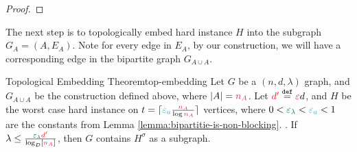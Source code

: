 \documentclass[11pt]{article}
\newcommand{\EnDeeLambda}{(n, d, \lambda)}
\newcommand{\Subdivision}[2]{{#1}^{#2}}
\newcommand{\epsilonA}{\textcolor{ballblue}{\epsilon_a}}
\newcommand{\epsilonL}{\textcolor{cadmiumgreen}{\epsilon_\lambda}}
\newcommand{\na}{\textcolor{razzmatazz}{n_A}}
\newcommand{\BipartiteG}{G_{A \cup A}}
\newcommand{\dApproxLower}{\textcolor{red}{d'}}
\begin{document}
\begin{proof}
%
%
%
%
%

\end{proof}


The next step is to topologically embed hard instance $H$ into the subgraph $G_A = (A, E_A)$.
Note for every edge in $E_A$, by our construction, we will have a corresponding edge in the bipartite graph $\BipartiteG$.

\begin{theorem}{Topological Embedding Theorem}{top-embedding}
Let $G$ be a $\EnDeeLambda$ graph, and $\BipartiteG$ be the construction defined above, where $|A| = \na$.
Let $\dApproxLower \Def \Eps d$, and $H$ be the worst case hard instance on $t = \lceil\epsilonA \frac{\na}{\log \na}\rceil$ vertices, where $0 < \epsilonL < \epsilonA <1$ are the constants from  Lemma \ref{lemma:bipartitie-is-non-blocking}.	
.
If $\lambda \leq \frac{\epsilonL\dApproxLower}{\log_D[\na]}$, then $G$ contains $\Subdivision{H}{\sigma}$ as a subgraph.

\end{theorem}
\end{document}

